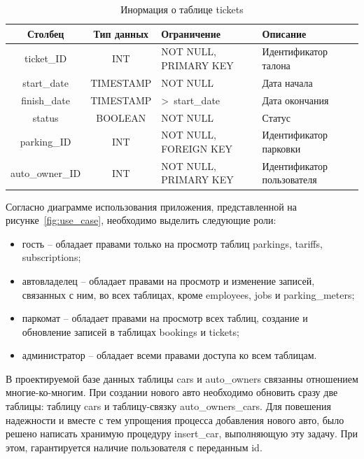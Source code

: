 \begin{table}[H]
	\begin{center}
		\begin{center}
			\caption{\label{tab:tickets}Инормация о таблице tickets}
		\end{center}
		\begin{tabular}{|c|c|p{3cm}|p{4cm}|}
			\hline 
			Столбец & Тип данных & Ограничение & Описание \\ \hline
			ticket\_ID & INT & NOT NULL, PRIMARY KEY & Идентификатор талона \\ \hline
	        start\_date & TIMESTAMP  & NOT NULL & Дата начала  \\ \hline
	        finish\_date &  TIMESTAMP & >~start\_date & Дата окончания  \\ \hline
	        status & BOOLEAN & NOT NULL & Статус \\ \hline
	        parking\_ID & INT & NOT NULL, FOREIGN KEY & Идентификатор парковки \\ \hline
	        auto\_owner\_ID & INT & NOT NULL, PRIMARY KEY & Идентификатор пользователя \\ \hline
		\end{tabular}
	\end{center}
\end{table}

Согласно диаграмме использования приложения, представленной на рисунке~\ref{fig:use_case}, необходимо выделить следующие роли:
\begin{itemize}
	\item гость -- обладает правами только на просмотр таблиц parkings, tariffs, subscriptions;
	\item автовладелец -- обладает правами на просмотр и изменение записей, связанных с ним, во всех таблицах, кроме employees, jobs и parking\_meters;
	\item паркомат -- обладает правами на просмотр всех таблиц, создание и обновление записей в таблицах bookings и tickets;
	\item администратор -- обладает всеми правами доступа ко всем таблицам.
\end{itemize}

В проектируемой базе данных таблицы cars и auto\_owners связанны отношением многие-ко-многим. 
При создании нового авто необходимо обновить сразу две таблицы: таблицу cars и таблицу-связку auto\_owners\_cars. 
Для повешения надежности и вместе с тем упрощения процесса добавления нового авто, было решено написать хранимую процедуру insert\_car, выполняющую эту задачу. При этом, гарантируется наличие пользователя с переданным id.

